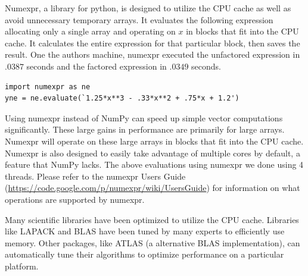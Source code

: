 Numexpr, a library for python, is designed to utilize the CPU cache as well as avoid unnecessary temporary arrays.
It evaluates the following expression allocating only a single array and operating on $x$ in blocks that fit into the CPU cache.
It calculates the entire expression for that particular block, then saves the result.
One the authors machine, numexpr executed the unfactored expression in $.0387$ seconds and the factored expression in $.0349$ seconds. 
\begin{lstlisting}
import numexpr as ne
yne = ne.evaluate(`1.25*x**3 - .33*x**2 + .75*x + 1.2')
\end{lstlisting}
Using numexpr instead of NumPy can speed up simple vector computations significantly.
These large gains in performance are primarily for large arrays.  
Numexpr will operate on these large arrays in blocks that fit into the CPU cache.  
Numexpr is also designed to easily take advantage of multiple cores by default, a feature that NumPy lacks.
The above evaluations using numexpr we done using 4 threads.  
Please refer to the numexpr Users Guide (\url{https://code.google.com/p/numexpr/wiki/UsersGuide}) for information on what operations are supported by numexpr.

Many scientific libraries have been optimized to utilize the CPU cache.
Libraries like LAPACK and BLAS have been tuned by many experts to efficiently use memory.
Other packages, like ATLAS (a alternative BLAS implementation), can automatically tune their algorithms to optimize performance on a particular platform.
